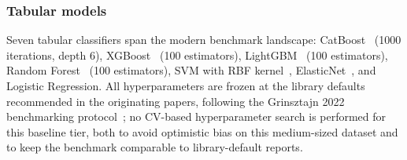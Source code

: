 \subsubsection{Tabular models}
Seven tabular classifiers span the modern benchmark landscape: CatBoost~\cite{prokhorenkova2018catboost} (1000 iterations, depth 6), XGBoost~\cite{chen2016xgboost} (100 estimators), LightGBM~\cite{ke2017lightgbm} (100 estimators), Random Forest~\cite{breiman2001} (100 estimators), SVM with RBF kernel~\cite{cortes1995svm}, ElasticNet~\cite{zou2005elastic}, and Logistic Regression. All hyperparameters are frozen at the library defaults recommended in the originating papers, following the Grinsztajn 2022 benchmarking protocol~\cite{grinsztajn2022}; no CV-based hyperparameter search is performed for this baseline tier, both to avoid optimistic bias on this medium-sized dataset and to keep the benchmark comparable to library-default reports.

